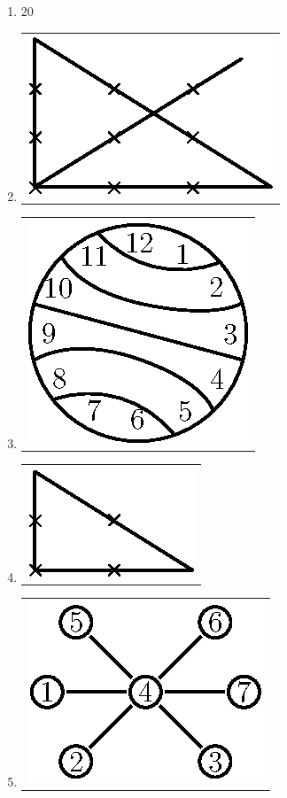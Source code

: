\begin{enumerate}
\item $20$

\item 
\begin{tabular}[c]{c}
\centering
\includegraphics{src/figures/ans30.eps}
\end{tabular}

\item 
\begin{tabular}[c]{c}
\centering
\includegraphics{src/figures/ans31.eps}
\end{tabular}

\item 
\begin{tabular}[c]{c}
\centering
\includegraphics{src/figures/ans32.eps}
\end{tabular}

\item 
\begin{tabular}[c]{c}
\centering
\includegraphics{src/figures/ans33.eps}
\end{tabular}


\end{enumerate}
